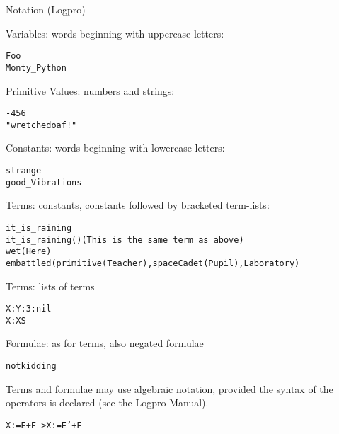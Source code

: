 \documentclass{popl}
\newenvironment{smalltt}{\begin{alltt}\smaller}{\end{alltt}}
\newcommand{\rmbox}[1]{\mbox{{\rm #1}}}
\begin{document}
\begin{foil}
\begin{cframed}
Notation (Logpro)
\end{cframed} 

Variables:      words beginning with uppercase letters: 
\begin{smalltt}
        Foo 
        Monty_Python
\end{smalltt}

Primitive Values:      numbers and strings:  
\begin{smalltt}
        123
        -456
        "wretched oaf!"
\end{smalltt}

Constants: words beginning with lowercase letters:
\begin{smalltt}
        strange 
        good_Vibrations
\end{smalltt}

Terms:       constants, constants followed by bracketed term-lists:
\begin{smalltt}
        it_is_raining
        it_is_raining()                  \rmbox{(This is the same term as above)}
        wet(Here)
        embattled(primitive(Teacher), spaceCadet(Pupil), Laboratory)
\end{smalltt}

Terms:       lists of terms 
\begin{smalltt}
             X:Y:3:nil
             X:XS
\end{smalltt}

Formulae:       as for terms, also negated formulae
\begin{smalltt}
        not kidding
\end{smalltt}

Terms and formulae may use algebraic notation, provided the syntax of the
operators is declared (see the Logpro Manual).
\begin{smalltt}
        X := E+F --> X := E'+F
\end{smalltt}

\end{foil}
\end{document}
